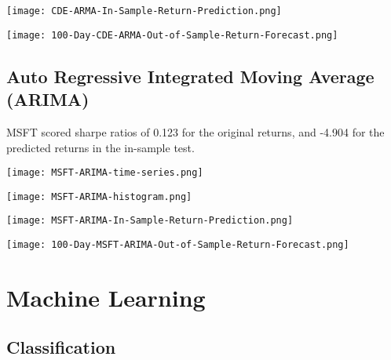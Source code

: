 \begin{center}
    \texttt{[image: CDE-ARMA-In-Sample-Return-Prediction.png]}
    \label{fig:nonfloat}
\end{center}

\begin{center}
    \texttt{[image: 100-Day-CDE-ARMA-Out-of-Sample-Return-Forecast.png]}
    \label{fig:nonfloat}
\end{center}

\subsection{Auto Regressive Integrated Moving Average (ARIMA)}

MSFT scored sharpe ratios of 0.123 for the original returns, and -4.904 for the predicted returns in the in-sample test.

\begin{center}  
    \texttt{[image: MSFT-ARIMA-time-series.png]}
    \label{fig:nonfloat}
\end{center}

\begin{center}
    \texttt{[image: MSFT-ARIMA-histogram.png]}
    \label{fig:nonfloat}
\end{center}

\begin{center}  
    \texttt{[image: MSFT-ARIMA-In-Sample-Return-Prediction.png]}
    \label{fig:nonfloat}
\end{center}

\begin{center}
    \texttt{[image: 100-Day-MSFT-ARIMA-Out-of-Sample-Return-Forecast.png]}
    \label{fig:nonfloat}
\end{center}

\section{Machine Learning}

\subsection{Classification}

